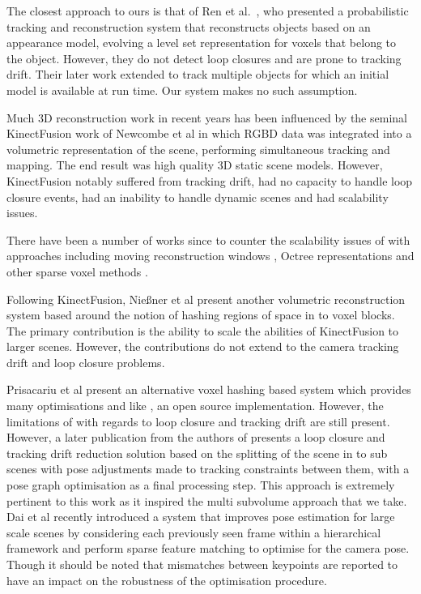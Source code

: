 The closest approach to ours is that of Ren et al.\ \cite{Ren2013}, who presented a probabilistic tracking and reconstruction system that reconstructs objects based on an appearance model, evolving a level set representation for voxels that belong to the object. However, they do not detect loop closures and are prone to tracking drift. Their later work \cite{Ren2014} extended \cite{Ren2013} to track multiple objects for which an initial model is available at run time. Our system makes no such assumption.

\iffalse
Much 3D reconstruction work in recent years has been influenced by the seminal KinectFusion work \cite{Newcombe2011} of Newcombe et al in which
RGBD data was integrated into a volumetric representation of the scene, performing simultaneous tracking and mapping. The end result was
high quality 3D static scene models. 
However, KinectFusion notably suffered from tracking drift, had no capacity to handle loop closure events, had an inability to handle dynamic scenes 
and had scalability issues.

There have been a number of works since to counter the scalability issues of \cite{Newcombe2011} with approaches including moving reconstruction 
windows \cite{Roth2012, Whelan2012}, Octree representations \cite{Zeng2012} and other sparse voxel methods \cite{Prisacariu2014, Chen2013}.

Following KinectFusion, Nie{\ss}ner et al present another volumetric reconstruction system \cite{Niessner2013} based around the notion of
hashing regions of space in to voxel blocks. The primary contribution is the ability to scale the abilities of KinectFusion to larger
scenes. However, the contributions do not extend to the camera tracking drift and loop closure problems.

Prisacariu et al present an alternative voxel hashing based system \cite{Prisacariu2014} which provides many optimisations and like \cite{Niessner2013}, an open source 
implementation. However, the limitations of \cite{Newcombe2011,Niessner2013} with regards to loop closure and tracking drift are still present. 
However, a later publication \cite{Kahler2016} from the authors of \cite{Prisacariu2014} presents a loop closure and tracking drift reduction 
solution based on the splitting of the scene in to sub scenes with pose adjustments made to tracking constraints between them, with 
a pose graph optimisation as a final processing step. This approach is extremely pertinent to this work as it inspired the multi subvolume approach 
that we take. Dai et al \cite{dai2016bundlefusion} recently introduced a system that improves pose estimation for large scale scenes by considering each previously seen 
frame within a hierarchical framework and perform sparse feature matching to optimise for the camera pose. Though it should be noted that mismatches between keypoints are 
reported to have an impact on the robustness of the optimisation procedure.

